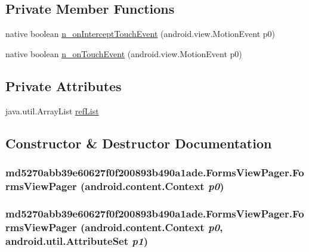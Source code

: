 \subsection*{Private Member Functions}
\begin{CompactItemize}
\item 
native boolean \hyperlink{classmd5270abb39e60627f0f200893b490a1ade_1_1_forms_view_pager_706a9c5163c73d9886ea08cb42e617ed}{n\_\-onInterceptTouchEvent} (android.view.MotionEvent p0)
\item 
native boolean \hyperlink{classmd5270abb39e60627f0f200893b490a1ade_1_1_forms_view_pager_250aed5e9b562880e22f64d879528867}{n\_\-onTouchEvent} (android.view.MotionEvent p0)
\end{CompactItemize}
\subsection*{Private Attributes}
\begin{CompactItemize}
\item 
java.util.ArrayList \hyperlink{classmd5270abb39e60627f0f200893b490a1ade_1_1_forms_view_pager_5a614138d55f15c99829c6d967ad7a1d}{refList}
\end{CompactItemize}


\subsection{Constructor \& Destructor Documentation}
\hypertarget{classmd5270abb39e60627f0f200893b490a1ade_1_1_forms_view_pager_1e733ee4a3786f4f7bd543951206fb73}{
\subsubsection[{FormsViewPager}]{\setlength{\rightskip}{0pt plus 5cm}md5270abb39e60627f0f200893b490a1ade.FormsViewPager.FormsViewPager (android.content.Context {\em p0})}}
\label{classmd5270abb39e60627f0f200893b490a1ade_1_1_forms_view_pager_1e733ee4a3786f4f7bd543951206fb73}


\hypertarget{classmd5270abb39e60627f0f200893b490a1ade_1_1_forms_view_pager_b7dadec2523ca0ad6456f61a31fbe5c9}{
\subsubsection[{FormsViewPager}]{\setlength{\rightskip}{0pt plus 5cm}md5270abb39e60627f0f200893b490a1ade.FormsViewPager.FormsViewPager (android.content.Context {\em p0}, \/  android.util.AttributeSet {\em p1})}}
\label{classmd5270abb39e60627f0f200893b490a1ade_1_1_forms_view_pager_b7dadec2523ca0ad6456f61a31fbe5c9}




